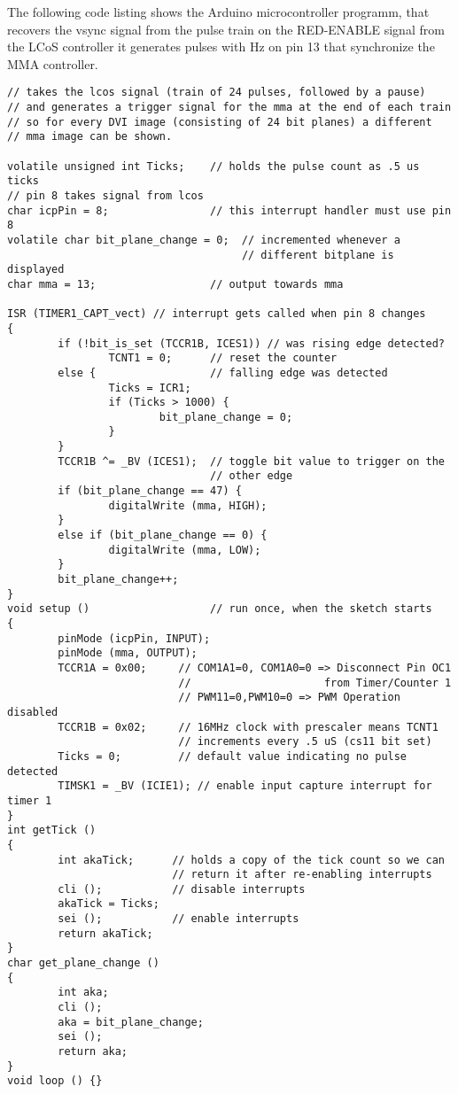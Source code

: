 The following code listing shows the Arduino microcontroller programm,
that recovers the vsync signal from the pulse train on the
\textsf{RED-ENABLE} signal from the LCoS controller it generates pulses
with \unit[60]{Hz} on pin 13 that synchronize the MMA controller.
{\small\label{fig:arduino-vsync}
\begin{verbatim}
// takes the lcos signal (train of 24 pulses, followed by a pause)
// and generates a trigger signal for the mma at the end of each train
// so for every DVI image (consisting of 24 bit planes) a different
// mma image can be shown. 

volatile unsigned int Ticks;    // holds the pulse count as .5 us ticks
// pin 8 takes signal from lcos
char icpPin = 8;                // this interrupt handler must use pin 8
volatile char bit_plane_change = 0;  // incremented whenever a 
                                     // different bitplane is displayed
char mma = 13;                  // output towards mma

ISR (TIMER1_CAPT_vect) // interrupt gets called when pin 8 changes
{
        if (!bit_is_set (TCCR1B, ICES1)) // was rising edge detected?
                TCNT1 = 0;      // reset the counter
        else {                  // falling edge was detected
                Ticks = ICR1;
                if (Ticks > 1000) {
                        bit_plane_change = 0;
                }
        }
        TCCR1B ^= _BV (ICES1);  // toggle bit value to trigger on the
                                // other edge
        if (bit_plane_change == 47) {
                digitalWrite (mma, HIGH);
        }
        else if (bit_plane_change == 0) {
                digitalWrite (mma, LOW);
        }
        bit_plane_change++;
}
void setup ()                   // run once, when the sketch starts
{
        pinMode (icpPin, INPUT);
        pinMode (mma, OUTPUT);
        TCCR1A = 0x00;     // COM1A1=0, COM1A0=0 => Disconnect Pin OC1
                           //                     from Timer/Counter 1
                           // PWM11=0,PWM10=0 => PWM Operation disabled
        TCCR1B = 0x02;     // 16MHz clock with prescaler means TCNT1
                           // increments every .5 uS (cs11 bit set)
        Ticks = 0;         // default value indicating no pulse detected
        TIMSK1 = _BV (ICIE1); // enable input capture interrupt for timer 1
}
int getTick ()
{
        int akaTick;      // holds a copy of the tick count so we can
                          // return it after re-enabling interrupts
        cli ();           // disable interrupts
        akaTick = Ticks;
        sei ();           // enable interrupts
        return akaTick;
}
char get_plane_change ()
{
        int aka;
        cli ();
        aka = bit_plane_change;
        sei ();
        return aka;
}
void loop () {}                 
\end{verbatim}
}


